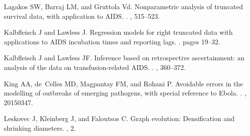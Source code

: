 \documentclass[12pt]{article}
\begin{document}
\begin{thebibliography}{10}
Lagakos SW, Barraj LM, and Gruttola Vd.
 {Nonparametric analysis of truncated survival data, with
  application to AIDS}.
.
, 515--523.

Kalbfleisch J and Lawless J.
 {Regression models for right truncated data with applications to
  AIDS incubation times and reporting lags}.
.
\newblock pages 19--32.

Kalbfleisch J and Lawless JF.
 {Inference based on retrospective ascertainment: an analysis of
  the data on transfusion-related AIDS}.
.
, 360--372.

King AA, de~Celles MD, Magpantay FM, and Rohani P.
 Avoidable errors in the modelling of outbreaks of emerging
  pathogens, with special reference to {Ebola}.
.
, 20150347.

Leskovec J, Kleinberg J, and Faloutsos C.
 Graph evolution: {Densification} and shrinking diameters.
, 2.

\end{thebibliography}
\end{document}
